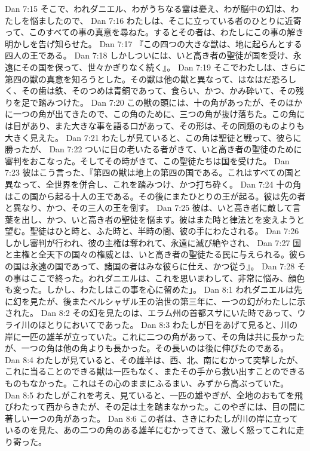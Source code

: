 Dan 7:15  そこで、われダニエル、わがうちなる霊は憂え、わが脳中の幻は、わたしを悩ましたので、
Dan 7:16  わたしは、そこに立っている者のひとりに近寄って、このすべての事の真意を尋ねた。するとその者は、わたしにこの事の解き明かしを告げ知らせた。
Dan 7:17  『この四つの大きな獣は、地に起らんとする四人の王である。
Dan 7:18  しかしついには、いと高き者の聖徒が国を受け、永遠にその国を保って、世々かぎりなく続く』。
Dan 7:19  そこでわたしは、さらに第四の獣の真意を知ろうとした。その獣は他の獣と異なって、はなはだ恐ろしく、その歯は鉄、そのつめは青銅であって、食らい、かつ、かみ砕いて、その残りを足で踏みつけた。
Dan 7:20  この獣の頭には、十の角があったが、そのほかに一つの角が出てきたので、この角のために、三つの角が抜け落ちた。この角には目があり、また大きな事を語る口があって、その形は、その同類のものよりも大きく見えた。
Dan 7:21  わたしが見ていると、この角は聖徒と戦って、彼らに勝ったが、
Dan 7:22  ついに日の老いたる者がきて、いと高き者の聖徒のために審判をおこなった。そしてその時がきて、この聖徒たちは国を受けた。
Dan 7:23  彼はこう言った、『第四の獣は地上の第四の国である。これはすべての国と異なって、全世界を併合し、これを踏みつけ、かつ打ち砕く。
Dan 7:24  十の角はこの国から起る十人の王である。その後にまたひとりの王が起る。彼は先の者と異なり、かつ、その三人の王を倒す。
Dan 7:25  彼は、いと高き者に敵して言葉を出し、かつ、いと高き者の聖徒を悩ます。彼はまた時と律法とを変えようと望む。聖徒はひと時と、ふた時と、半時の間、彼の手にわたされる。
Dan 7:26  しかし審判が行われ、彼の主権は奪われて、永遠に滅び絶やされ、
Dan 7:27  国と主権と全天下の国々の権威とは、いと高き者の聖徒たる民に与えられる。彼らの国は永遠の国であって、諸国の者はみな彼らに仕え、かつ従う』。
Dan 7:28  その事はここで終った。われダニエルは、これを思いまわして、非常に悩み、顔色も変った。しかし、わたしはこの事を心に留めた」。
Dan 8:1  われダニエルは先に幻を見たが、後またベルシャザル王の治世の第三年に、一つの幻がわたしに示された。
Dan 8:2  その幻を見たのは、エラム州の首都スサにいた時であって、ウライ川のほとりにおいてであった。
Dan 8:3  わたしが目をあげて見ると、川の岸に一匹の雄羊が立っていた。これに二つの角があって、その角は共に長かったが、一つの角は他の角よりも長かった。その長いのは後に伸びたのである。
Dan 8:4  わたしが見ていると、その雄羊は、西、北、南にむかって突撃したが、これに当ることのできる獣は一匹もなく、またその手から救い出すことのできるものもなかった。これはその心のままにふるまい、みずから高ぶっていた。
Dan 8:5  わたしがこれを考え、見ていると、一匹の雄やぎが、全地のおもてを飛びわたって西からきたが、その足は土を踏まなかった。このやぎには、目の間に著しい一つの角があった。
Dan 8:6  この者は、さきにわたしが川の岸に立っているのを見た、あの二つの角のある雄羊にむかってきて、激しく怒ってこれに走り寄った。
